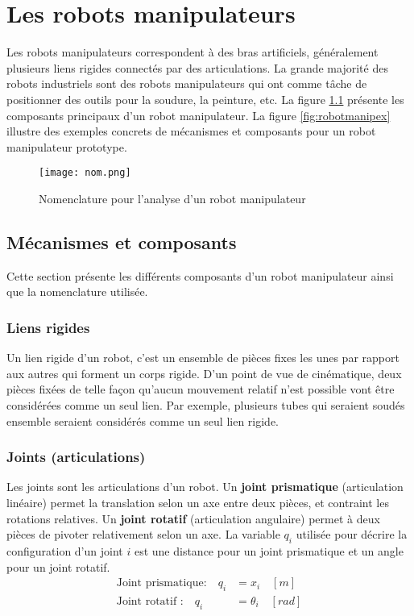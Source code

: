 \chapter{Les robots manipulateurs}
\label{sec:robotmanip}

Les robots manipulateurs correspondent à des bras artificiels, généralement plusieurs liens rigides connectés par des articulations. La grande majorité des robots industriels sont des robots manipulateurs qui ont comme tâche de positionner des outils pour la soudure, la peinture, etc. La figure \ref{fig:nom} présente les composants principaux d'un robot manipulateur. La figure \ref{fig:robotmanipex} illustre des exemples concrets de mécanismes et composants pour un robot manipulateur prototype.

\begin{figure}[H]
	\centering
	\texttt{[image: nom.png]}
	\caption{Nomenclature pour l'analyse d'un robot manipulateur}
	\label{fig:nom}
\end{figure}

\section{Mécanismes et composants}

Cette section présente les différents composants d'un robot manipulateur ainsi que la nomenclature utilisée.

\subsection{Liens rigides}

Un lien rigide d'un robot, c'est un ensemble de pièces fixes les unes par rapport aux autres qui forment un corps rigide. D'un point de vue de cinématique, deux pièces fixées de telle façon qu'aucun mouvement relatif n'est possible vont être considérées comme un seul lien. Par exemple, plusieurs tubes qui seraient soudés ensemble seraient considérés comme un seul lien rigide.

\subsection{Joints (articulations)}

Les joints sont les articulations d'un robot. Un \textbf{joint prismatique} (articulation linéaire) permet la translation selon un axe entre deux pièces, et contraint les rotations relatives. Un \textbf{joint rotatif} (articulation angulaire) permet à deux pièces de pivoter relativement selon un axe. La variable $q_i$ utilisée pour décrire la configuration d'un joint $i$ est une distance pour un joint prismatique et un angle pour un joint rotatif.
\begin{align}
	\text{Joint prismatique:} \quad q_i &= x_i      \quad [m] \\
	\text{Joint rotatif    :} \quad q_i &= \theta_i \quad [rad]
\end{align}

